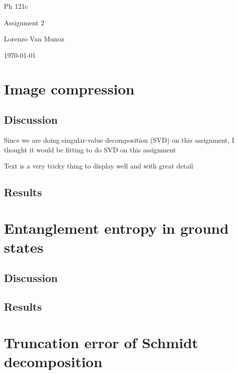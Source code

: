 \documentclass{article}
\begin{document}
{\centering

Ph 121c

Assignment 2

Lorenzo Van Munoz

\today

}

\tableofcontents

\newpage

\section{
Image compression
}

\subsection{
Discussion
}

Since we are doing singular-value decomposition (SVD) on this assignment,
I thought it would be fitting to do SVD on this assignment


Text is a very tricky thing to display well and with great detail

\subsection{
Results
}



\newpage

\section{
Entanglement entropy in ground states
}

\subsection{
Discussion
}



\subsection{
Results
}



\newpage

\section{
Truncation error of Schmidt decomposition
}
\end{document}
